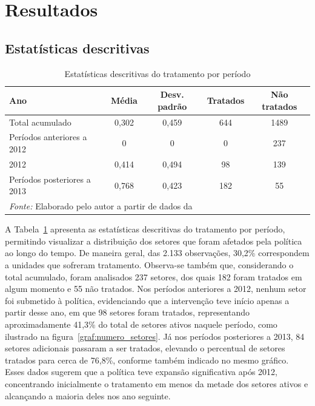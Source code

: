 \documentclass[12pt,a4paper,oneside]{article}
\begin{document}
		 
		
		
		
		\section{Resultados}
		
		\subsection{Estatísticas descritivas}
		

		
\begin{table}[H]
	\centering
	\caption{Estatísticas descritivas do tratamento por período}
	\label{tab:estat_desc_trat}
	\begin{tabular}{lcccc} %
		\hline
		\textbf{Ano} & \textbf{Média} & \textbf{Desv. padrão} & \textbf{Tratados} & \textbf{Não tratados} \\
		\hline
		Total acumulado & 0,302 & 0,459 & 644 & 1489 \\
		Períodos anteriores a 2012 & 0 & 0 & 0 & 237 \\
		2012 & 0,414 & 0,494 & 98 & 139 \\
		Períodos posteriores a 2013 & 0,768 & 0,423 & 182 & 55 \\
		\hline
		\multicolumn{5}{l}{\footnotesize \textit{Fonte:} Elaborado pelo autor a partir de dados da \citet{desoneracao2019}} \\
	\end{tabular}
\end{table}

		
		A Tabela~\ref{tab:estat_desc_trat} apresenta as estatísticas descritivas do tratamento por período, permitindo visualizar a distribuição dos setores que foram afetados pela política ao longo do tempo. De maneira geral, das 2.133 observações, 30,2\% correspondem a unidades que sofreram tratamento. Observa-se também que, considerando o total acumulado, foram analisados 237 setores, dos quais 182 foram tratados em algum momento e 55 não tratados. Nos períodos anteriores a 2012, nenhum setor foi submetido à política, evidenciando que a intervenção teve início apenas a partir desse ano, em que 98 setores foram tratados, representando aproximadamente 41,3\% do total de setores ativos naquele período, como ilustrado na figura~\ref{graf:numero_setores}. Já nos períodos posteriores a 2013, 84 setores adicionais passaram a ser tratados, elevando o percentual de setores tratados para cerca de 76,8\%, conforme também indicado no mesmo gráfico. Esses dados sugerem que a política teve expansão significativa após 2012, concentrando inicialmente o tratamento em menos da metade dos setores ativos e alcançando a maioria deles nos ano seguinte.
		
\end{document}
